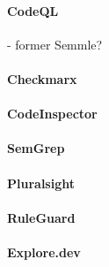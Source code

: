 \paragraph{CodeQL} - former Semmle?

\paragraph{Checkmarx}

\paragraph{CodeInspector}
\paragraph{SemGrep}
\paragraph{Pluralsight}

\paragraph{RuleGuard}

\paragraph{Explore.dev}

